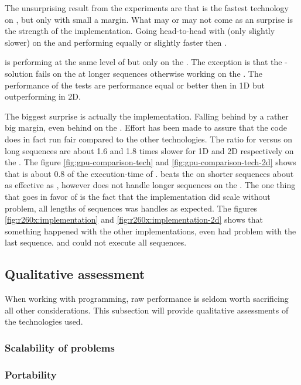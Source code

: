 The unsurprising result from the experiments are that {\CU} is the fastest technology on {\NVCARD}, but only with small a margin. What may or may not come as an surprise is the strength of the {\DX} implementation. Going head-to-head with {\CU} (only slightly slower) on the {\NVCARD} and performing equally or slightly faster then {\OCL}.

{\GL} is performing at the same level of {\DX} but only on the {\AMDCARD}. The exception is that the {\GL}-solution fails on the {\AMDCARD} at longer sequences otherwise working on the {\NVCARD}. The performance of the {\GL} tests are performance equal or better then {\OCL} in 1D but outperforming {\OCL} in 2D.

The biggest surprise is actually the {\OCL} implementation. Falling behind by a rather big margin, even behind on the \AMDCARD. Effort has been made to assure that the code does in fact run fair compared to the other technologies. The ratio for {\OCL} versus {\CU} on long sequences are about 1.6 and 1.8 times slower for 1D and 2D respectively on the {\NVCARD}. The figure \ref{fig:gpu-comparison-tech} and \ref{fig:gpu-comparison-tech-2d} shows that {\DX} is about 0.8 of the execution-time of {\OCL}. {\GL} beats the {\OCL} on shorter sequences about as effective as {\DX}, however does not handle longer sequences on the {\AMDCARD}. The one thing that goes in favor of {\OCL} is the fact that the implementation did scale without problem, all lengths of sequences was handles as expected. The figures \ref{fig:r260x:implementation} and \ref{fig:r260x:implementation-2d} shows that something happened with the other implementations, even {\CLFFT} had problem with the last sequence. {\GL} and {\DX} could not execute all sequences.

\subsection{Qualitative assessment}

When working with programming, raw performance is seldom worth sacrificing all other considerations. This subsection will provide qualitative assessments of the technologies used.

\subsubsection{Scalability of problems}



\subsubsection{Portability}



